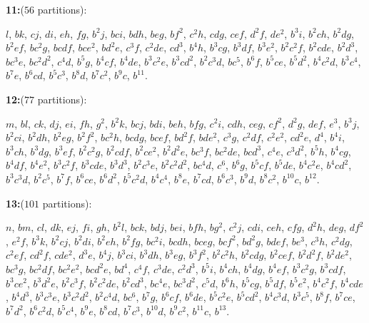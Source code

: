 \documentclass[11pt,a4paper]{article}
\begin{document}
\newpage
{\sloppy
\noindent\textbf{11:}\quad ($56$ partitions):\par\noindent
$l$, $bk$, $cj$, $di$, $eh$, $fg$, $b^{2}j$, $bci$, $bdh$, $beg$, $bf^{2}$, $c^{2}h$, $cdg$, $cef$, $d^{2}f$, $de^{2}$, $b^{3}i$, $b^{2}ch$, $b^{2}dg$, $b^{2}ef$, $bc^{2}g$, $bcdf$, $bce^{2}$, $bd^{2}e$, $c^{3}f$, $c^{2}de$, $cd^{3}$, $b^{4}h$, $b^{3}cg$, $b^{3}df$, $b^{3}e^{2}$, $b^{2}c^{2}f$, $b^{2}cde$, $b^{2}d^{3}$, $bc^{3}e$, $bc^{2}d^{2}$, $c^{4}d$, $b^{5}g$, $b^{4}cf$, $b^{4}de$, $b^{3}c^{2}e$, $b^{3}cd^{2}$, $b^{2}c^{3}d$, $bc^{5}$, $b^{6}f$, $b^{5}ce$, $b^{5}d^{2}$, $b^{4}c^{2}d$, $b^{3}c^{4}$, $b^{7}e$, $b^{6}cd$, $b^{5}c^{3}$, $b^{8}d$, $b^{7}c^{2}$, $b^{9}c$, $b^{11}$.

\smallskip
\noindent\textbf{12:}\quad ($77$ partitions):\par\noindent
$m$, $bl$, $ck$, $dj$, $ei$, $fh$, $g^{2}$, $b^{2}k$, $bcj$, $bdi$, $beh$, $bfg$, $c^{2}i$, $cdh$, $ceg$, $cf^{2}$, $d^{2}g$, $def$, $e^{3}$, $b^{3}j$, $b^{2}ci$, $b^{2}dh$, $b^{2}eg$, $b^{2}f^{2}$, $bc^{2}h$, $bcdg$, $bcef$, $bd^{2}f$, $bde^{2}$, $c^{3}g$, $c^{2}df$, $c^{2}e^{2}$, $cd^{2}e$, $d^{4}$, $b^{4}i$, $b^{3}ch$, $b^{3}dg$, $b^{3}ef$, $b^{2}c^{2}g$, $b^{2}cdf$, $b^{2}ce^{2}$, $b^{2}d^{2}e$, $bc^{3}f$, $bc^{2}de$, $bcd^{3}$, $c^{4}e$, $c^{3}d^{2}$, $b^{5}h$, $b^{4}cg$, $b^{4}df$, $b^{4}e^{2}$, $b^{3}c^{2}f$, $b^{3}cde$, $b^{3}d^{3}$, $b^{2}c^{3}e$, $b^{2}c^{2}d^{2}$, $bc^{4}d$, $c^{6}$, $b^{6}g$, $b^{5}cf$, $b^{5}de$, $b^{4}c^{2}e$, $b^{4}cd^{2}$, $b^{3}c^{3}d$, $b^{2}c^{5}$, $b^{7}f$, $b^{6}ce$, $b^{6}d^{2}$, $b^{5}c^{2}d$, $b^{4}c^{4}$, $b^{8}e$, $b^{7}cd$, $b^{6}c^{3}$, $b^{9}d$, $b^{8}c^{2}$, $b^{10}c$, $b^{12}$.

\smallskip
\noindent\textbf{13:}\quad ($101$ partitions):\par\noindent
$n$, $bm$, $cl$, $dk$, $ej$, $fi$, $gh$, $b^{2}l$, $bck$, $bdj$, $bei$, $bfh$, $bg^{2}$, $c^{2}j$, $cdi$, $ceh$, $cfg$, $d^{2}h$, $deg$, $df^{2}$, $e^{2}f$, $b^{3}k$, $b^{2}cj$, $b^{2}di$, $b^{2}eh$, $b^{2}fg$, $bc^{2}i$, $bcdh$, $bceg$, $bcf^{2}$, $bd^{2}g$, $bdef$, $be^{3}$, $c^{3}h$, $c^{2}dg$, $c^{2}ef$, $cd^{2}f$, $cde^{2}$, $d^{3}e$, $b^{4}j$, $b^{3}ci$, $b^{3}dh$, $b^{3}eg$, $b^{3}f^{2}$, $b^{2}c^{2}h$, $b^{2}cdg$, $b^{2}cef$, $b^{2}d^{2}f$, $b^{2}de^{2}$, $bc^{3}g$, $bc^{2}df$, $bc^{2}e^{2}$, $bcd^{2}e$, $bd^{4}$, $c^{4}f$, $c^{3}de$, $c^{2}d^{3}$, $b^{5}i$, $b^{4}ch$, $b^{4}dg$, $b^{4}ef$, $b^{3}c^{2}g$, $b^{3}cdf$, $b^{3}ce^{2}$, $b^{3}d^{2}e$, $b^{2}c^{3}f$, $b^{2}c^{2}de$, $b^{2}cd^{3}$, $bc^{4}e$, $bc^{3}d^{2}$, $c^{5}d$, $b^{6}h$, $b^{5}cg$, $b^{5}df$, $b^{5}e^{2}$, $b^{4}c^{2}f$, $b^{4}cde$, $b^{4}d^{3}$, $b^{3}c^{3}e$, $b^{3}c^{2}d^{2}$, $b^{2}c^{4}d$, $bc^{6}$, $b^{7}g$, $b^{6}cf$, $b^{6}de$, $b^{5}c^{2}e$, $b^{5}cd^{2}$, $b^{4}c^{3}d$, $b^{3}c^{5}$, $b^{8}f$, $b^{7}ce$, $b^{7}d^{2}$, $b^{6}c^{2}d$, $b^{5}c^{4}$, $b^{9}e$, $b^{8}cd$, $b^{7}c^{3}$, $b^{10}d$, $b^{9}c^{2}$, $b^{11}c$, $b^{13}$.
\par}
\end{document}
